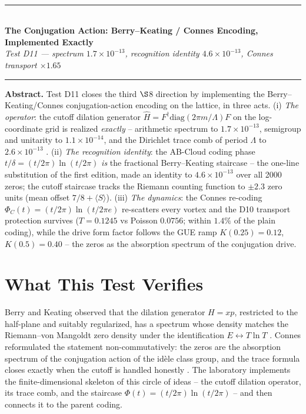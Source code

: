 \documentclass[11pt,a4paper]{article}
\begin{document}
\\[0.3em]
\rule{\textwidth}{0.8pt}\\[0.6em]
{\LARGE\bfseries\color{labblue} The Conjugation Action: Berry--Keating / Connes Encoding, Implemented Exactly}\\[0.5em]
{\normalsize\itshape Test D11 — spectrum $1.7\times10^{-13}$, recognition identity $4.6\times10^{-13}$, Connes transport $\times1.65$}\\[0.4em]
\rule{\textwidth}{0.4pt}

\begin{tcolorbox}[colback=labgreen!8, colframe=labgreen!70!black, title={Verdict: PASS — 15/15 checks}, fonttitle=\bfseries, boxrule=0.6pt]
\textbf{Abstract.} Test D11 closes the third $\S$8 direction by implementing the Berry--Keating/Connes conjugation-action encoding on the lattice, in three acts. (i) \emph{The operator}: the cutoff dilation generator $\hat{H} = F^\dagger \mathrm{diag}(2\pi m/\Lambda) F$ on the log-coordinate grid is realized \emph{exactly} -- arithmetic spectrum to $1.7\times10^{-13}$, semigroup and unitarity to $1.1\times10^{-14}$, and the Dirichlet trace comb of period $\Lambda$ to $2.6\times10^{-13}$ \cite{berrykeating,connes}. (ii) \emph{The recognition identity}: the AB-Cloud coding phase $t/\delta = (t/2\pi)\ln(t/2\pi)$ \emph{is} the fractional Berry--Keating staircase -- the one-line substitution of the first edition, made an identity to $4.6\times10^{-13}$ over all 2000 zeros; the cutoff staircase tracks the Riemann counting function to $\pm 2.3$ zero units (mean offset $7/8 + \langle S\rangle$). (iii) \emph{The dynamics}: the Connes re-coding $\Phi_C(t) = (t/2\pi)\ln(t/2\pi e)$ re-scatters every vortex and the D10 transport protection survives ($T = 0.1245$ vs Poisson $0.0756$; within $1.4\%$ of the plain coding), while the drive form factor follows the GUE ramp $K(0.25) = 0.12$, $K(0.5) = 0.40$ -- the zeros as the absorption spectrum of the conjugation drive.
\end{tcolorbox}

\section{What This Test Verifies}
Berry and Keating observed that the dilation generator $H = xp$, restricted to the half-plane and suitably regularized, has a spectrum whose density matches the Riemann--von Mangoldt zero density under the identification $E \leftrightarrow T\ln T$ \cite{berrykeating}. Connes reformulated the statement non-commutatively: the zeros are the absorption spectrum of the conjugation action of the id\`ele class group, and the trace formula closes exactly when the cutoff is handled honestly \cite{connes,connesconsani}. The laboratory implements the finite-dimensional skeleton of this circle of ideas -- the cutoff dilation operator, its trace comb, and the staircase $\Phi(t) = (t/2\pi)\ln(t/2\pi)$ -- and then connects it to the parent coding.
\end{document}
